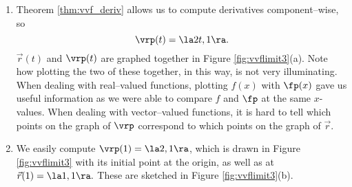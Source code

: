 {\begin{enumerate}
\item	Theorem \ref{thm:vvf_deriv} allows us to compute derivatives component--wise, so
$$\vrp(t) = \la 2t, 1\ra.$$ $\vec r(t)$ and $\vrp(t)$ are graphed together in Figure \ref{fig:vvflimit3}(a). Note how plotting the two of these together, in this way, is not very illuminating. When dealing with real--valued functions, plotting $f(x)$ with $\fp(x)$ gave us useful information as we were able to compare $f$ and $\fp$ at the same $x$-values. When dealing with vector--valued functions, it is hard to tell which points on the graph of $\vrp$ correspond to which points on the graph of $\vec r$.

\item	We easily compute $\vrp(1) = \la 2,1\ra$, which is drawn in Figure \ref{fig:vvflimit3} with its initial point at the origin, as well as at $\vec r(1) = \la 1,1\ra.$ These are sketched in Figure \ref{fig:vvflimit3}(b).

\end{enumerate}
\baselineskip
}\\
\clearpage

